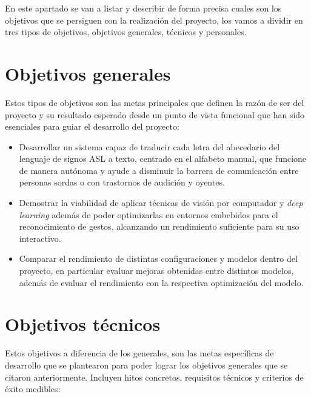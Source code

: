 
En este apartado se van a listar y describir de forma precisa cuales son los objetivos que se persiguen con la realización del proyecto, los vamos a dividir en tres tipos de objetivos, objetivos generales, técnicos y personales.

\section{Objetivos generales}\label{objetivos-generales}
Estos tipos de objetivos son las metas principales que definen la razón de ser del proyecto y su resultado esperado desde un punto de vista funcional que han sido esenciales para guiar el desarrollo del proyecto:

\begin{itemize} 
\tightlist
    \item Desarrollar un sistema capaz de traducir cada letra del abecedario del lenguaje de signos ASL a texto, centrado en el alfabeto manual, que funcione de manera autónoma y ayude a disminuir la barrera de comunicación entre personas sordas o con trastornos de audición y oyentes.

    \item Demostrar la viabilidad de aplicar técnicas de visión por computador y \textit{deep learning} además de poder optimizarlas en entornos embebidos para el reconocimiento de gestos, alcanzando un rendimiento suficiente para su uso interactivo.

    \item Comparar el rendimiento de distintas configuraciones y modelos dentro del proyecto, en particular evaluar mejoras obtenidas entre distintos modelos, además de evaluar el rendimiento con la respectiva optimización del modelo.
\end{itemize}


\section{Objetivos técnicos}\label{objetivos-técnicos}
Estos objetivos a diferencia de los generales, son las metas específicas de desarrollo que se plantearon para poder lograr los objetivos generales que se citaron anteriormente. Incluyen hitos concretos, requisitos técnicos y criterios de éxito medibles:

